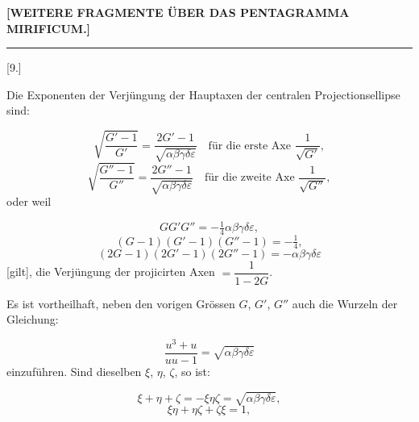 
\begin{center}\textbf{[WEITERE FRAGMENTE ÜBER DAS PENTAGRAMMA MIRIFICUM.]}\end{center}

\begin{center}\rule{1.5cm}{.4pt}\end{center}

\begin{center}[9.]\end{center}

Die Exponenten der Verjüngung der Hauptaxen der centralen Projectionsellipse sind:

\[
\sqrt{\dfrac{G'-1}{G'}} = \dfrac{2G'-1}{\sqrt{\alpha\beta\gamma\delta\varepsilon}} \quad \text{für die erste Axe } \dfrac{1}{\sqrt{G'}},
\]
\[
\sqrt{\dfrac{G''-1}{G''}} = \dfrac{2G''-1}{\sqrt{\alpha\beta\gamma\delta\varepsilon}} \quad \text{für die zweite Axe } \dfrac{1}{\sqrt{G''}},
\]
oder weil

\[
GG'G'' = -\tfrac14 \alpha\beta\gamma\delta\varepsilon,
\]
\[
(G-1)(G'-1)(G''-1) = -\tfrac14,
\]
\[
(2G-1)(2G'-1)(2G''-1) = -\alpha\beta\gamma\delta\varepsilon
\]
[gilt], die Verjüngung der projicirten Axen $= \dfrac{1}{1-2G}$.

Es ist vortheilhaft, neben den vorigen Grössen $G$, $G'$, $G''$ auch die Wurzeln der Gleichung:

\[
\frac{u^3+u}{uu-1} = \sqrt{\alpha\beta\gamma\delta\varepsilon}
\]
einzuführen. Sind dieselben $\xi$, $\eta$, $\zeta$, so ist:

\[
\xi+\eta+\zeta = -\xi\eta\zeta = \sqrt{\alpha\beta\gamma\delta\varepsilon},
\]
\[
\xi\eta+\eta\zeta+\zeta\xi = 1,
\]
